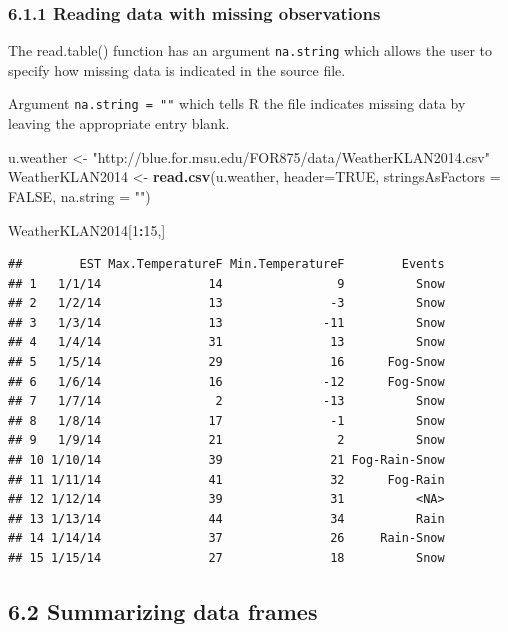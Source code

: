 \documentclass[]{article}
\newenvironment{Shaded}{\begin{snugshade}}{\end{snugshade}}
\newcommand{\KeywordTok}[1]{\textcolor[rgb]{0.13,0.29,0.53}{\textbf{#1}}}
\newcommand{\DataTypeTok}[1]{\textcolor[rgb]{0.13,0.29,0.53}{#1}}
\newcommand{\DecValTok}[1]{\textcolor[rgb]{0.00,0.00,0.81}{#1}}
\newcommand{\StringTok}[1]{\textcolor[rgb]{0.31,0.60,0.02}{#1}}
\newcommand{\OtherTok}[1]{\textcolor[rgb]{0.56,0.35,0.01}{#1}}
\newcommand{\OperatorTok}[1]{\textcolor[rgb]{0.81,0.36,0.00}{\textbf{#1}}}
\newcommand{\NormalTok}[1]{#1}
\begin{document}
\subsubsection{6.1.1 Reading data with missing
observations}\label{reading-data-with-missing-observations}

The read.table() function has an argument \texttt{na.string} which
allows the user to specify how missing data is indicated in the source
file.

Argument \texttt{na.string\ =\ ""} which tells R the file indicates
missing data by leaving the appropriate entry blank.

\begin{Shaded}
\begin{Highlighting}[]
\NormalTok{u.weather <-}\StringTok{ "http://blue.for.msu.edu/FOR875/data/WeatherKLAN2014.csv"}
\NormalTok{WeatherKLAN2014 <-}\StringTok{ }\KeywordTok{read.csv}\NormalTok{(u.weather, }\DataTypeTok{header=}\OtherTok{TRUE}\NormalTok{, }\DataTypeTok{stringsAsFactors =} \OtherTok{FALSE}\NormalTok{, }\DataTypeTok{na.string =} \StringTok{""}\NormalTok{)}

\NormalTok{WeatherKLAN2014[}\DecValTok{1}\OperatorTok{:}\DecValTok{15}\NormalTok{,]}
\end{Highlighting}
\end{Shaded}

\begin{verbatim}
##        EST Max.TemperatureF Min.TemperatureF        Events
## 1   1/1/14               14                9          Snow
## 2   1/2/14               13               -3          Snow
## 3   1/3/14               13              -11          Snow
## 4   1/4/14               31               13          Snow
## 5   1/5/14               29               16      Fog-Snow
## 6   1/6/14               16              -12      Fog-Snow
## 7   1/7/14                2              -13          Snow
## 8   1/8/14               17               -1          Snow
## 9   1/9/14               21                2          Snow
## 10 1/10/14               39               21 Fog-Rain-Snow
## 11 1/11/14               41               32      Fog-Rain
## 12 1/12/14               39               31          <NA>
## 13 1/13/14               44               34          Rain
## 14 1/14/14               37               26     Rain-Snow
## 15 1/15/14               27               18          Snow
\end{verbatim}

\subsection{6.2 Summarizing data frames}\label{summarizing-data-frames}
\end{document}
